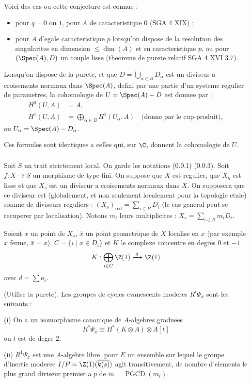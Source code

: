 Voici des cas ou cette conjecture est connue :
\begin{itemize}
\item pour $q = 0$ ou $1$, pour $A$ de caracteristique $0$ (SGA 4 XIX) ;
\item pour $A$ d'egale caracteristique $p$ lorsqu'on dispose de la resolution des singularites en dimension $\leqslant \dim(A)$ et en caracteristique $p$, ou pour $(\Spec(A), D)$ un couple lisse (theoreme de purete relatif SGA 4 XVI 3.7).
\end{itemize}

Lorsqu'on dispose de la purete, et que $D = \bigcup_{\alpha \in B} D_\alpha$ est un diviseur a croisements normaux dans $\Spec(A)$, defini par une partie d'un systeme regulier de parametres, la cohomologie de $U = \Spec(A) - D$ est donnee par :
\begin{align*}
H^0(U, A) &= A, \\
H^1(U, A) &= \bigoplus_{\alpha \in B} H^1(U_\alpha, A) \quad \text{(donne par le cup-produit)},
\end{align*}
ou $U_\alpha = \Spec(A) - D_\alpha$.

Ces formules sont identiques a celles qui, sur $\C$, donnent la cohomologie de $U$.

\subsubsection{}
\label{subsubsec:3.2}
Soit $S$ un trait strictement local. On garde les notations (0.0.1) (0.0.3). Soit $f: X \to S$ un morphisme de type fini. On suppose que $X$ est regulier, que $X_\eta$ est lisse et que $X_s$ est un diviseur a croisements normaux dans $X$. On supposera que ce diviseur est (globalement, et non seulement localement pour la topologie etale) somme de diviseurs reguliers : $(X_s)_{\mathrm{red}} = \sum_{i \in B} D_i$ (le cas general peut se recuperer par localisation). Notons $m_i$ leurs multiplicites : $X_s = \sum_{i \in B} m_i D_i$.

Soient $x$ un point de $X_s$, $\bar{x}$ un point geometrique de $X$ localise en $x$ (par exemple $x$ ferme, $\bar{x} = x$), $C = \{i \mid x \in D_i\}$ et $K$ le complexe concentre en degres $0$ et $-1$
\[
K : \bigoplus_{i \in C} \Z(1) \xrightarrow{\;d\;} \Z(1)
\]
avec $d = \sum a_i$.

\begin{theorem}
\label{thm:3.3}
(Utilise la purete). Les groupes de cycles evanescents moderes $R^i \Psi_{\bar{x}}$ sont les suivants :

\textnormal{(i)} On a un isomorphisme canonique de $A$-algebres graduees
\[
R^* \Psi_{\bar{x}} \cong H^*(K \otimes A) \otimes A[t]
\]
ou $t$ est de degre $2$.

\textnormal{(ii)} $R^1 \Psi_{\bar{x}}$ est une $A$-algebre libre, pour $E$ un ensemble sur lequel le groupe d'inertie moderee $I/P = \Z(1)(\overline{k(s)})$ agit transitivement, de nombre d'elements le plus grand diviseur premier a $p$ de $m = \operatorname{PGCD}(m_i)$.
\end{theorem}

